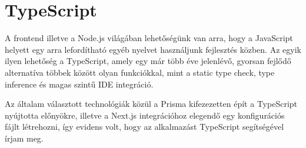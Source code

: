 \section{TypeScript}
A frontend illetve a Node.js világában lehetőségünk van arra, hogy a JavaScript helyett egy arra lefordítható
egyéb nyelvet használjunk fejlesztés közben. Az egyik ilyen lehetőség a TypeScript\cite{TypeScript}, amely egy már több éve jelenlévő,
gyorsan fejlődő alternatíva többek között olyan funkciókkal, mint a static type check, type inference és magas szintű IDE
integráció.

Az általam választott technológiák közül a Prisma kifezezetten épít a TypeScript nyújtotta előnyökre, illetve a Next.js
integrációhoz elegendő egy konfigurációs fájlt létrehozni, így evidens volt, hogy az alkalmazást TypeScript segítségével írjam meg.
